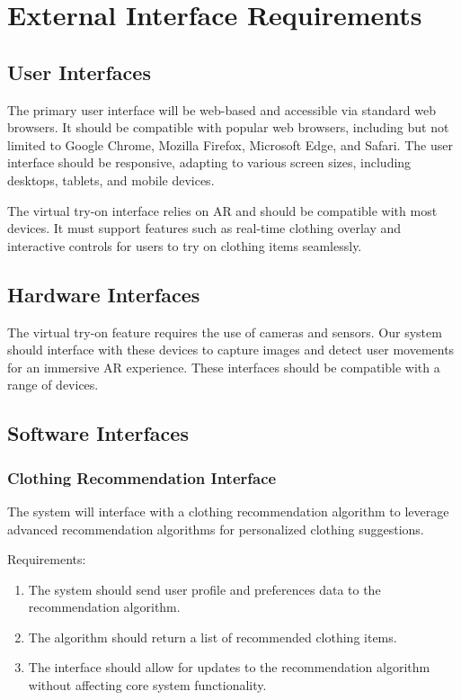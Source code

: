 \section{External Interface Requirements}
	\subsection{User Interfaces}
		The primary user interface will be web-based and accessible via standard web browsers. It should be compatible with popular web browsers, including but not limited to Google Chrome, Mozilla Firefox, Microsoft Edge, and Safari. The user interface should be responsive, adapting to various screen sizes, including desktops, tablets, and mobile devices.

		The virtual try-on interface relies on AR and should be compatible with most devices. It must support features such as real-time clothing overlay and interactive controls for users to try on clothing items seamlessly.
	
	\subsection{Hardware Interfaces}
		The virtual try-on feature requires the use of cameras and sensors. Our system should interface with these devices to capture images and detect user movements for an immersive AR experience. These interfaces should be compatible with a range of devices.

	\subsection{Software Interfaces}
		\subsubsection{Clothing Recommendation Interface}
			The system will interface with a clothing recommendation algorithm to leverage advanced recommendation algorithms for personalized clothing suggestions.

			Requirements:
			\begin{enumerate}
				\item The system should send user profile and preferences data to the recommendation algorithm.
				\item The algorithm should return a list of recommended clothing items.
				\item The interface should allow for updates to the recommendation algorithm without affecting core system functionality.
			\end{enumerate}
		
